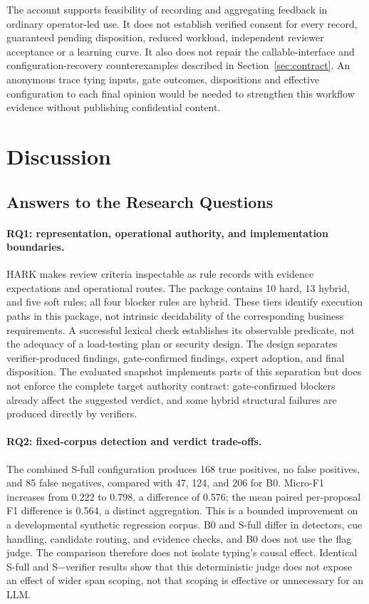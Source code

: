 \documentclass[computers,article,submit,moreauthors]{Definitions/mdpi}
\begin{document}
The account supports feasibility of recording and aggregating feedback in ordinary operator-led use. It does not establish verified consent for every record, guaranteed pending disposition, reduced workload, independent reviewer acceptance or a learning curve. It also does not repair the callable-interface and configuration-recovery counterexamples described in Section~\ref{sec:contract}. An anonymous trace tying inputs, gate outcomes, dispositions and effective configuration to each final opinion would be needed to strengthen this workflow evidence without publishing confidential content.

\section{Discussion}\label{sec:discussion}

\subsection{Answers to the Research Questions}

\paragraph{RQ1: representation, operational authority, and implementation boundaries.}
HARK makes review criteria inspectable as rule records with evidence expectations and operational routes. The package contains 10 hard, 13 hybrid, and five soft rules; all four blocker rules are hybrid. These tiers identify execution paths in this package, not intrinsic decidability of the corresponding business requirements. A successful lexical check establishes its observable predicate, not the adequacy of a load-testing plan or security design. The design separates verifier-produced findings, gate-confirmed findings, expert adoption, and final disposition. The evaluated snapshot implements parts of this separation but does not enforce the complete target authority contract: gate-confirmed blockers already affect the suggested verdict, and some hybrid structural failures are produced directly by verifiers.

\paragraph{RQ2: fixed-corpus detection and verdict trade-offs.}
The combined S-full configuration produces 168 true positives, no false positives, and 85 false negatives, compared with 47, 124, and 206 for B0. Micro-F1 increases from 0.222 to 0.798, a difference of 0.576; the mean paired per-proposal F1 difference is 0.564, a distinct aggregation. This is a bounded improvement on a developmental synthetic regression corpus. B0 and S-full differ in detectors, cue handling, candidate routing, and evidence checks, and B0 does not use the flag judge. The comparison therefore does not isolate typing's causal effect. Identical S-full and S$-$verifier results show that this deterministic judge does not expose an effect of wider span scoping, not that scoping is effective or unnecessary for an LLM.
\end{document}
